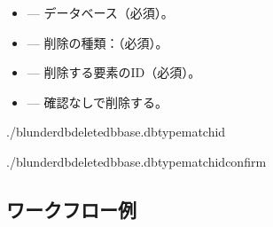 \documentclass[letterpaper,10pt,dvipdfmx]{sphinxmanual}
\begin{document}
\sphinxAtStartPar
{}
\begin{itemize}
\item {} 
\sphinxAtStartPar
{} — データベース（必須）。

\item {} 
\sphinxAtStartPar
{} — 削除の種類：（必須）。

\item {} 
\sphinxAtStartPar
{} — 削除する要素のID（必須）。

\item {} 
\sphinxAtStartPar
{} — 確認なしで削除する。

\end{itemize}

\sphinxAtStartPar
{}

\begin{sphinxVerbatim}[commandchars=\\\{\}]
./blunderdbdelete\PYGZhy{}\PYGZhy{}dbbase.db\PYGZhy{}\PYGZhy{}typematch\PYGZhy{}\PYGZhy{}id

./blunderdbdelete\PYGZhy{}\PYGZhy{}dbbase.db\PYGZhy{}\PYGZhy{}typematch\PYGZhy{}\PYGZhy{}id\PYGZhy{}\PYGZhy{}confirm
\end{sphinxVerbatim}


\subsection{ワークフロー例}
\label{\detokenize{cli:exemples-de-flux-de-travail}}
\end{document}
